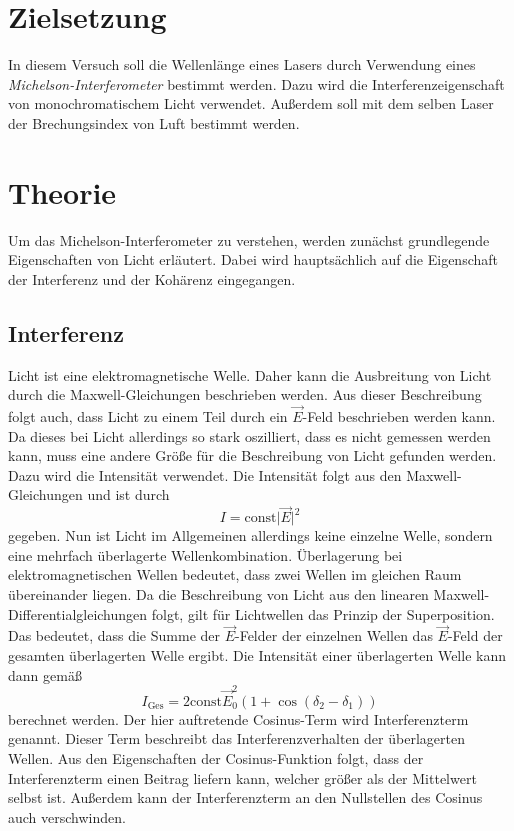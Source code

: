\section{Zielsetzung}
\label{sec:Ziel}
In diesem Versuch soll die Wellenlänge eines Lasers durch Verwendung eines \textit{Michelson-Interferometer} bestimmt werden. Dazu wird die Interferenzeigenschaft von monochromatischem 
Licht verwendet. Außerdem soll mit dem selben Laser der Brechungsindex von Luft bestimmt werden.

\section{Theorie}
\label{sec:Theorie}
Um das Michelson-Interferometer zu verstehen, werden zunächst grundlegende Eigenschaften von Licht erläutert. Dabei wird hauptsächlich auf die Eigenschaft der Interferenz und
der Kohärenz eingegangen. 
\subsection{Interferenz}
\label{subsec:Interferenz}
Licht ist eine elektromagnetische Welle. Daher kann die Ausbreitung von Licht durch die Maxwell-Gleichungen beschrieben werden. Aus dieser Beschreibung folgt auch, dass Licht
zu einem Teil durch ein $\vec{E}$-Feld beschrieben werden kann. Da dieses bei Licht allerdings so stark oszilliert, dass es nicht gemessen werden kann, muss eine andere Größe für die
Beschreibung von Licht gefunden werden. Dazu wird die Intensität verwendet. Die Intensität folgt aus den Maxwell-Gleichungen und ist durch 
\begin{equation*}
    I = \text{const}\lvert \vec{E} \rvert^2
\end{equation*}
gegeben. 
Nun ist Licht im Allgemeinen allerdings keine einzelne Welle, sondern eine mehrfach überlagerte Wellenkombination. Überlagerung bei elektromagnetischen Wellen bedeutet, dass 
zwei Wellen im gleichen Raum übereinander liegen. Da die Beschreibung von Licht aus den linearen Maxwell-Differentialgleichungen folgt, gilt für Lichtwellen das Prinzip der
Superposition. Das bedeutet, dass die Summe der $\vec{E}$-Felder der einzelnen Wellen das $\vec{E}$-Feld der gesamten überlagerten Welle ergibt. Die Intensität einer 
überlagerten Welle kann dann gemäß 
\begin{equation}
    I_\text{Ges} = 2 \text{const}\vec{E}_0^2(1 + \cos(\delta_2 - \delta_1))
\end{equation}
berechnet werden. Der hier auftretende Cosinus-Term wird Interferenzterm genannt. Dieser Term beschreibt das Interferenzverhalten der überlagerten Wellen. Aus den Eigenschaften
der Cosinus-Funktion folgt, dass der Interferenzterm einen Beitrag liefern kann, welcher größer als der Mittelwert selbst ist. Außerdem kann der Interferenzterm an den 
Nullstellen des Cosinus auch verschwinden. 

